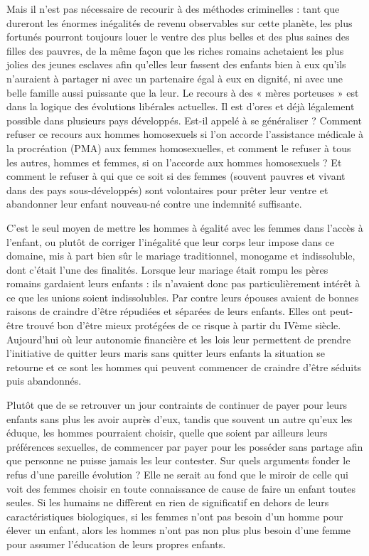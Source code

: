  Mais il n'est pas nécessaire de recourir à des méthodes criminelles : tant que dureront les énormes inégalités de revenu observables sur cette planète, les plus fortunés pourront toujours louer le ventre des plus belles et des plus saines des filles des pauvres, de la même façon que les riches romains achetaient les plus jolies des jeunes esclaves afin qu'elles leur fassent des enfants bien à eux qu'ils n'auraient à partager ni avec un partenaire égal à eux en dignité, ni avec une belle famille aussi puissante que la leur. Le recours à des « mères porteuses » est dans la logique des évolutions libérales actuelles. Il est d'ores et déjà légalement possible dans plusieurs pays développés. Est-il appelé à se généraliser ? Comment refuser ce recours aux hommes homosexuels si l'on accorde l'assistance médicale à la procréation (PMA) aux femmes homosexuelles, et comment le refuser à tous les autres, hommes et femmes, si on l'accorde aux hommes homosexuels ? Et comment le refuser à qui que ce soit si des femmes (souvent pauvres et vivant dans des pays sous-développés) sont volontaires pour prêter leur ventre et abandonner leur enfant nouveau-né contre une indemnité suffisante. 

 C'est le seul moyen de mettre les hommes à égalité avec les femmes dans l'accès à l'enfant, ou plutôt de corriger l'inégalité que leur corps leur impose dans ce domaine, mis à part bien sûr le mariage traditionnel, monogame et indissoluble, dont c'était l'une des finalités. Lorsque leur mariage était rompu les pères romains gardaient leurs enfants : ils n'avaient donc pas particulièrement intérêt à ce que les unions soient indissolubles. Par contre leurs épouses avaient de bonnes raisons de craindre d'être répudiées et séparées de leurs enfants. Elles ont peut-être trouvé bon d'être mieux protégées de ce risque à partir du IVème siècle. Aujourd'hui où leur autonomie financière et les lois leur permettent de prendre l'initiative de quitter leurs maris sans quitter leurs enfants la situation se retourne et ce sont les hommes qui peuvent commencer de craindre d'être séduits puis abandonnés. 

 Plutôt que de se retrouver un jour contraints de continuer de payer pour leurs enfants sans plus les avoir auprès d'eux, tandis que souvent un autre qu'eux les éduque, les hommes pourraient choisir, quelle que soient par ailleurs leurs préférences sexuelles, de commencer par payer pour les posséder sans partage afin que personne ne puisse jamais les leur contester. Sur quels arguments fonder le refus d'une pareille évolution ? Elle ne serait au fond que le miroir de celle qui voit des femmes choisir en toute connaissance de cause de faire un enfant toutes seules. Si les humains ne diffèrent en rien de significatif en dehors de leurs caractéristiques biologiques, si les femmes n'ont pas besoin d'un homme pour élever un enfant, alors les hommes n'ont pas non plus plus besoin d'une femme pour assumer l'éducation de leurs propres enfants.

